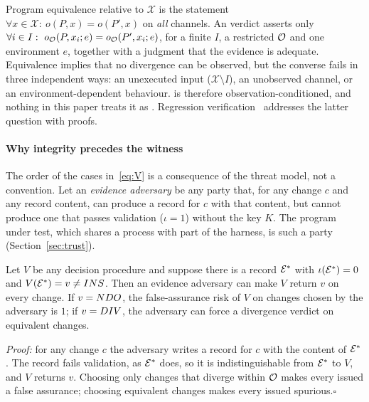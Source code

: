 \begin{remark}\label{rem:equiv}
Program equivalence relative to $\mathcal{X}$ is the statement $\forall x\in\mathcal{X}:\ o(P,x)=o(P',x)$ on \emph{all} channels. An \NDO{} verdict asserts only $\forall i\in I:\ o_{\obs}(P,x_i;e)=o_{\obs}(P',x_i;e)$, for a finite $I$, a restricted $\mathcal{O}$ and one environment $e$, together with a judgment that the evidence is adequate. Equivalence implies that no divergence can be observed, but the converse fails in three independent ways: an unexecuted input ($\mathcal{X}\setminus I$), an unobserved channel, or an environment-dependent behaviour. \NDO{} is therefore observation-conditioned, and nothing in this paper treats it as . Regression verification~\cite{godlin2009regression,lahiri2012symdiff} addresses the latter question with proofs.
\end{remark}

\paragraph*{Why integrity precedes the witness} The order of the cases in~\eqref{eq:V} is a consequence of the threat model, not a convention. Let an \emph{evidence adversary} be any party that, for any change $c$ and any record content, can produce a record for $c$ with that content, but cannot produce one that passes validation ($\iota=1$) without the key $K$. The program under test, which shares a process with part of the harness, is such a party (Section~\ref{sec:trust}).

\begin{proposition}\label{prop:integrity}
Let $V$ be any decision procedure and suppose there is a record $\mathcal{E}^\ast$ with $\iota(\mathcal{E}^\ast)=0$ and $V(\mathcal{E}^\ast)=v\neq INS{}$. Then an evidence adversary can make $V$ return $v$ on every change. If $v=NDO{}$, the false-assurance risk of $V$ on changes chosen by the adversary is $1$; if $v=DIV{}$, the adversary can force a divergence verdict on equivalent changes.
\end{proposition}
\emph{Proof:} for any change $c$ the adversary writes a record for $c$ with the content of $\mathcal{E}^\ast$. The record fails validation, as $\mathcal{E}^\ast$ does, so it is indistinguishable from $\mathcal{E}^\ast$ to $V$, and $V$ returns $v$. Choosing only changes that diverge within $\mathcal{O}$ makes every issued \NDO{} a false assurance; choosing equivalent changes makes every issued \DIV{} spurious.\hfill$\square$

